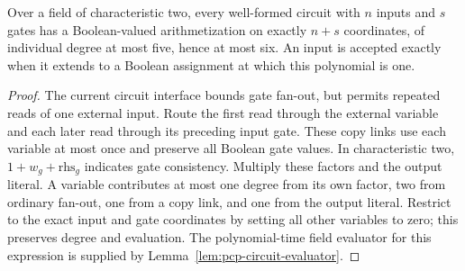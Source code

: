\begin{lemma}
\label{lem:pcp-circuit-arithmetization}
\leanok
Over a field of characteristic two, every well-formed circuit with $n$ inputs
and $s$ gates has a Boolean-valued arithmetization on exactly $n+s$ coordinates,
of individual degree at most five, hence at most six. An input is accepted
exactly when it extends to a Boolean assignment at which this polynomial is one.
\end{lemma}
\begin{proof}
\leanok
The current circuit interface bounds gate fan-out, but permits repeated reads of
one external input. Route the first read through the external variable and each
later read through its preceding input gate. These copy links use each variable
at most once and preserve all Boolean gate values. In characteristic two,
$1+w_g+\mathrm{rhs}_g$ indicates gate consistency. Multiply these factors and
the output literal. A variable contributes at most one degree from its own
factor, two from ordinary fan-out, one from a copy link, and one from the output
literal. Restrict to the exact input and gate coordinates by setting all other
variables to zero; this preserves degree and evaluation. The polynomial-time
field evaluator for this expression is supplied by Lemma~\ref{lem:pcp-circuit-evaluator}.
\end{proof}


